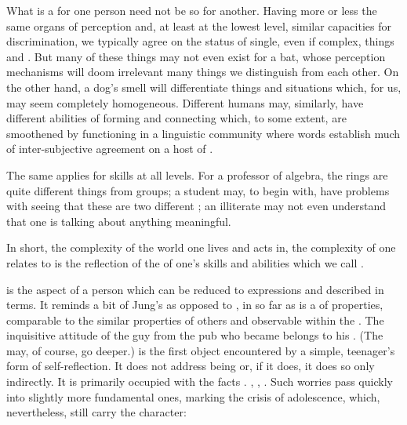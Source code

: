 What is a  for one person need not be so for another. Having more or
less the same organs of perception and, at least at the lowest level, similar
capacities for discrimination, we typically agree on the status of single,
even if complex, things and . But many of these things may not even
exist for a bat, whose perception mechanisms will doom irrelevant many things we
distinguish from each other. On the other hand, a dog's smell will differentiate
things and situations which, for us, may seem completely homogeneous. Different
humans may, similarly, have different abilities of forming and connecting 
which, to some extent, are smoothened by functioning in a linguistic community
where words establish much of inter-subjective agreement on a host of
.

The same applies for skills at all levels.  For a professor of
algebra, the rings are quite different things from groups; a student
may, to begin with, have problems with seeing that these are two
different ; an illiterate may not even understand that
one is talking about anything meaningful.

In short, the complexity of the world one lives and acts in, the 
complexity of  one relates to is the reflection of the 
 of one's skills and abilities which we call
.

\pa
{} is the aspect of a person which can be reduced to 
expressions and described in  terms. It reminds a bit of Jung's
 as opposed to , in so far as  is a
 of  properties, comparable to the similar
properties of others and observable within the \hoa. The inquisitive attitude of
the guy from the pub who became  belongs to his
. (The  may, of course, go deeper.) 
 is the first object encountered by a simple, teenager's form of
self-reflection. It does not address being or, if it does, it does so only
indirectly. It is primarily occupied with the facts .
, , . Such worries pass quickly into slightly more
fundamental ones, marking the crisis of adolescence, which, nevertheless, still
carry the  character:   

